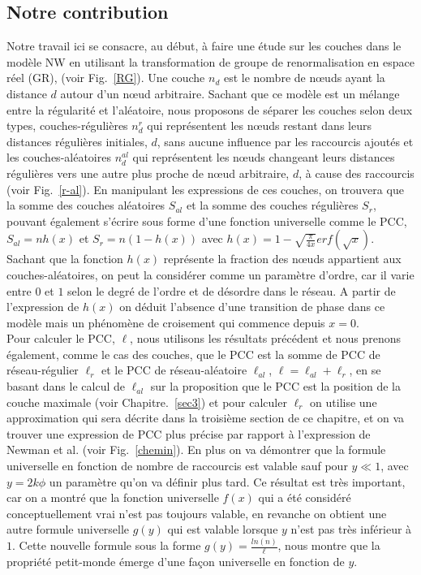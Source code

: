 \subsection{Notre contribution}
Notre travail ici se consacre, au début, à faire une étude sur les couches dans le modèle NW en utilisant la transformation de groupe de renormalisation en espace réel (GR), (voir Fig.~\ref{RG}). Une couche $n_d$ est le nombre de nœuds ayant la distance $d$ autour d'un nœud arbitraire. Sachant que ce modèle est un mélange entre la régularité et l'aléatoire,
nous proposons de séparer les couches selon deux types, couches-régulières $n_d^r$ qui représentent les nœuds restant dans leurs distances régulières initiales, $d$, sans aucune influence par les raccourcis ajoutés et les  couches-aléatoires $n_d^{al}$ qui représentent les nœuds changeant leurs distances régulières vers une autre 
plus proche de nœud arbitraire, $d$, à cause des raccourcis (voir Fig.~\ref{r-al}). En manipulant les expressions de ces couches, on trouvera que la somme des couches aléatoires $S_{al}$ et la somme des couches régulières $S_{r}$, pouvant également s'écrire sous  forme d'une fonction universelle comme le PCC, $S_{al}=nh(x)$ et $S_{r}=n(1-h(x))$ avec $h(x)=1-\sqrt{\frac{\pi}{4x}}erf(\sqrt{x})$. 
Sachant que la fonction $h(x)$ représente la fraction des nœuds appartient aux couches-aléatoires, on peut la considérer comme un
paramètre d'ordre, car il varie entre $0$ et $1$ selon le degré de l'ordre et de désordre dans le réseau. A partir de l'expression de $h(x)$ on déduit l'absence d'une transition de phase dans ce modèle mais un phénomène de croisement qui commence depuis $x=0$.\\

Pour calculer le PCC, $\ell$, 
nous utilisons les résultats précédent et nous prenons également, comme le cas des couches, que le PCC est la somme de PCC de réseau-régulier $\ell_{r}$ et le PCC de réseau-aléatoire  $\ell_{al}$, $\ell=\ell_{al}+\ell_r$, en se
 basant dans le calcul de $\ell_{al}$ sur la proposition que le PCC est la position de la couche maximale (voir Chapitre.~\ref{sec3}) et pour calculer $\ell_r$ on utilise une approximation qui sera décrite dans la troisième section de ce chapitre, et on va trouver une expression de PCC  plus précise par rapport à l'expression de Newman et al. (voir Fig.~\ref{chemin}).
En plus on va démontrer que la formule universelle en fonction de nombre de raccourcis est valable sauf pour $y\ll1$, avec $y=2k\phi$ un paramètre qu'on va définir plus tard. Ce résultat est très important, car on a montré que la fonction  universelle $f(x)$ qui a été considéré conceptuellement vrai n'est pas toujours valable, en revanche on obtient une autre formule universelle $g(y)$ qui est valable lorsque  $y$ n'est pas très inférieur à $1$. Cette nouvelle formule sous la forme $g(y)=\frac{ln(n)}{\ell}$, nous montre que la propriété petit-monde émerge d'une façon universelle en fonction de $y$.

